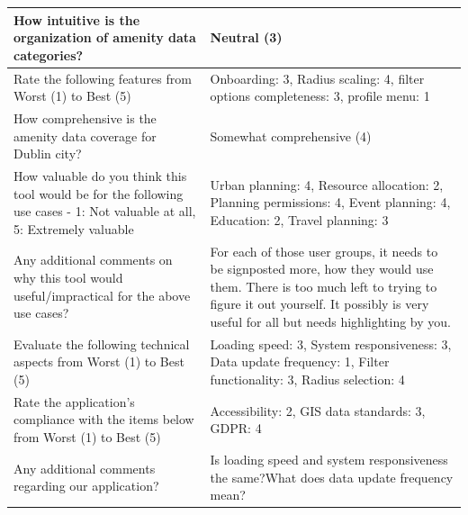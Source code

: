 \documentclass{report}
\begin{document}
\begin{table}[h!]
\begin{tabularx}{\textwidth}{|p{}|X|}
        How intuitive is the organization of amenity data categories?                                                            & Neutral (3)                                                                                                                                                                                                           \\ \hline
        Rate the following features from Worst (1) to Best (5)                                                                   & Onboarding: 3, Radius scaling: 4, filter options completeness: 3, profile menu: 1                                                                                                                                     \\ \hline
        How comprehensive is the amenity data coverage for Dublin city?                                                          & Somewhat comprehensive (4)                                                                                                                                                                                            \\ \hline
        How valuable do you think this tool would be for the following use cases - 1: Not valuable at all, 5: Extremely valuable & Urban planning: 4, Resource allocation: 2, Planning permissions: 4, Event planning: 4, Education: 2, Travel planning: 3                                                                                               \\ \hline
        Any additional comments on why this tool would useful/impractical for the above use cases?                               & For each of those user groups, it needs to be signposted more, how they would use them. There is too much left to trying to figure it out yourself. It possibly is very useful for all but needs highlighting by you. \\ \hline
        Evaluate the following technical aspects from Worst (1) to Best (5)                                                      & Loading speed: 3, System responsiveness: 3, Data update frequency: 1, Filter functionality: 3, Radius selection: 4                                                                                                    \\ \hline
        Rate the application's compliance with the items below from Worst (1) to Best (5)                                        & Accessibility: 2, GIS data standards: 3, GDPR: 4                                                                                                                                                                      \\ \hline
        Any additional comments regarding our application?                                                                       & Is loading speed and system responsiveness the same?What does data update frequency mean?                                                                                                                             \\ \hline
    \end{tabularx}
\end{table}
\end{document}
